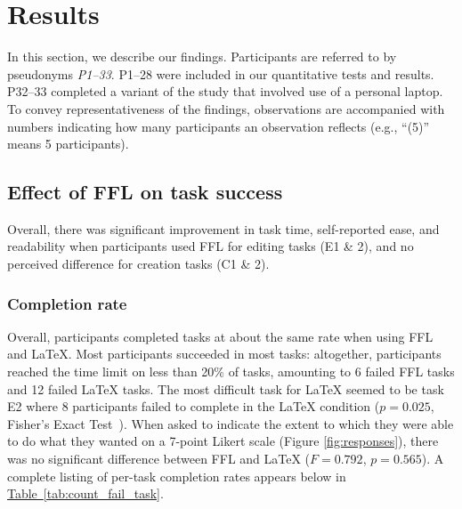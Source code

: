 \section{Results}\label{results}

In this section, we describe our findings. Participants are referred to by pseudonyms \textit{P1--33}. P1--28 were included in our quantitative tests and results. P32--33 completed a variant of the study that involved use of a personal laptop. To convey representativeness of the findings, observations are accompanied with numbers indicating how many participants an observation reflects (e.g., ``(5)'' means 5 participants).

\subsection{Effect of FFL on task success} %

Overall, there was significant improvement in task time, self-reported ease, and readability when participants used FFL for editing tasks (E1 \& 2), and no perceived difference for creation tasks (C1 \& 2).

\subsubsection{Completion rate} Overall, participants completed tasks at about the same rate when using FFL and LaTeX. Most participants succeeded in most tasks: altogether, participants reached the time limit on less than 20\% of tasks, amounting to 6 failed FFL tasks and 12 failed LaTeX tasks. The most difficult task for LaTeX seemed to be task E2 where 8 participants failed to complete in the LaTeX condition ($p=0.025$, {Fisher's Exact Test}~\cite{fisher}).
When asked to indicate the extent to which they were able to do what they wanted on a 7-point Likert scale (Figure \ref{fig:responses}), there was no significant difference between FFL and LaTeX ($F=0.792$, $p=0.565$).
A complete listing of per-task completion rates appears below in \hyperref[tab:count_fail_task]{Table~\ref{tab:count_fail_task}}.

